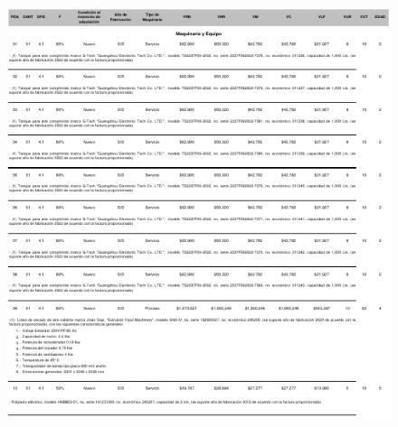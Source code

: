 \begin{figure}[hbtp!]
	\centering
	\includegraphics[width=  \linewidth, page = 5]{../0.imagenes/CAP_10/cap_10}
\end{figure}
\newpage

